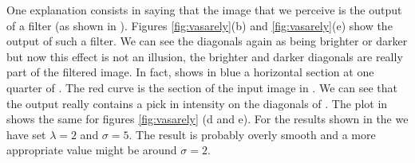 One explanation consists in saying that the image that we perceive is the output of a filter (as shown in \eqn{\ref{eq:humanmodel}}). Figures \ref{fig:vasarely}(b) and \ref{fig:vasarely}(e) show the output of such a filter. We can see the diagonals again as being brighter or darker but now this effect is not an illusion, the brighter and darker diagonals are really part of the filtered image. In fact,  shows in blue a horizontal section at one quarter of . The red curve is the section of the input image in . We can see that the output really contains a pick in intensity on the diagonals of . The plot in  shows the same for figures \ref{fig:vasarely} (d and e). For the results shown in the \fig{\ref{fig:vasarely}} we have set $\lambda = 2$ and $\sigma = 5$. The result is probably overly smooth and a more appropriate value might be around $\sigma =2$.

